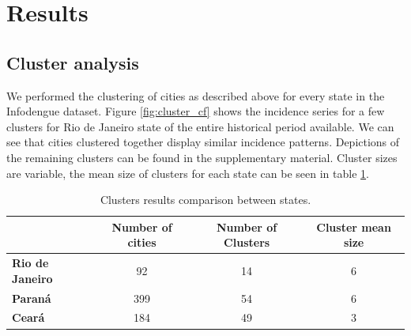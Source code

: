 \documentclass[12pt]{report}
\begin{document}
\section{Results}
\label{results}

\subsection{Cluster analysis}

We performed the clustering of cities as described above for every state in the Infodengue dataset. Figure \ref{fig:cluster_cf} shows the incidence series for a few clusters for Rio de Janeiro state of the entire historical period available. We can see that cities clustered together display similar incidence patterns. Depictions of the remaining clusters can be found in the supplementary material. Cluster sizes are variable, the mean size of clusters for each state can be seen in table \ref{tab:clusters_size}.

\begin{table}
\begin{center}
\begin{tabular}{lccc}
  & \textbf{Number of cities} & \textbf{Number of Clusters} & \textbf{Cluster mean size}\\
 \hline
 \textbf{Rio de Janeiro} & 92 & 14 & 6\\
 \textbf{Paraná} & 399 & 54 & 6 \\
 \textbf{Ceará} & 184 & 49 & 3 \\
 \hline
\end{tabular}
\label{tab:clusters_size}
\caption{Clusters results comparison between states.}
\end{center}
\end{table}
\end{document}
